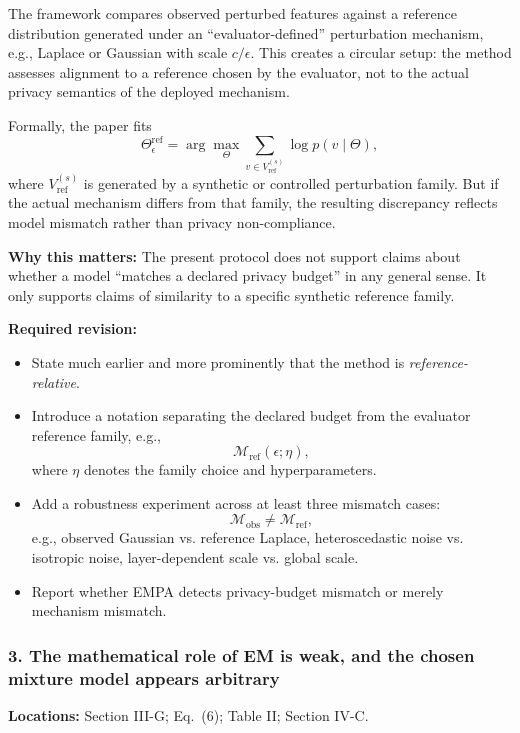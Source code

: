 The framework compares observed perturbed features against a reference distribution generated under an ``evaluator-defined'' perturbation mechanism, e.g., Laplace or Gaussian with scale $c/\epsilon$. This creates a circular setup: the method assesses alignment to a reference chosen by the evaluator, not to the actual privacy semantics of the deployed mechanism.

Formally, the paper fits
\begin{equation}
\Theta_{\epsilon}^{\mathrm{ref}} = \arg\max_{\Theta} \sum_{v \in V^{(s)}_{\mathrm{ref}}} \log p(v \mid \Theta),
\end{equation}
where $V^{(s)}_{\mathrm{ref}}$ is generated by a synthetic or controlled perturbation family. But if the actual mechanism differs from that family, the resulting discrepancy reflects model mismatch rather than privacy non-compliance.

\textbf{Why this matters:} The present protocol does not support claims about whether a model ``matches a declared privacy budget'' in any general sense. It only supports claims of similarity to a specific synthetic reference family.

\textbf{Required revision:}
\begin{itemize}
    \item State much earlier and more prominently that the method is \emph{reference-relative}.
    \item Introduce a notation separating the declared budget from the evaluator reference family, e.g.,
    \begin{equation}
    \mathcal{M}_{\mathrm{ref}}(\epsilon; \eta),
    \end{equation}
    where $\eta$ denotes the family choice and hyperparameters.
    \item Add a robustness experiment across at least three mismatch cases:
    \begin{equation}
    \mathcal{M}_{\mathrm{obs}} \neq \mathcal{M}_{\mathrm{ref}},
    \end{equation}
    e.g., observed Gaussian vs. reference Laplace, heteroscedastic noise vs. isotropic noise, layer-dependent scale vs. global scale.
    \item Report whether EMPA detects privacy-budget mismatch or merely mechanism mismatch.
\end{itemize}

\subsubsection*{3. The mathematical role of EM is weak, and the chosen mixture model appears arbitrary}
\textbf{Locations:} Section III-G; Eq.~(6); Table II; Section IV-C.

